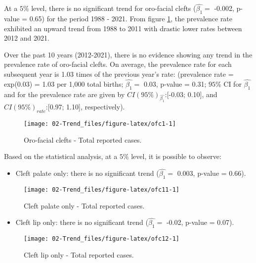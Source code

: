 \documentclass[
]{krantz}
\providecommand{\tightlist}{%
  \setlength{\itemsep}{0pt}\setlength{\parskip}{0pt}}
\begin{document}
At a \(5\%\) level, there is no significant trend for oro-facial clefts (\(\hat{\beta_{1}} =\) -0.002, p-value = 0.65) for the period 1988 - 2021. From figure \ref{fig:ofc1}, the prevalence rate exhibited an upward trend from 1988 to 2011 with drastic lower rates between 2012 and 2021.

Over the past 10 years (2012-2021), there is no evidence showing any trend in the prevalence rate of oro-facial clefts. On average, the prevalence rate for each subsequent year is 1.03 times of the previous year's rate: (prevalence rate = exp(0.03) = 1.03 per 1,000 total births; \(\hat{\beta_{1}} =\) 0.03, p-value = 0.31; \(95\%\) CI for \(\hat{\beta_{1}}\) and for the prevalence rate are given by \(CI(95\%)_{\hat{\beta_{1}}}\):{[}-0.03; 0.10{]}, and \(CI(95\%)_{rate}\):{[}0.97; 1.10{]}, respectively).

\begin{figure}[h]

{\centering \texttt{[image: 02-Trend\_files/figure-latex/ofc1-1]} 

}

\caption{Oro-facial clefts - Total reported cases.}\label{fig:ofc1}
\end{figure}

Based on the statistical analysis, at a \(5\%\) level, it is possible to observe:

\begin{itemize}
\tightlist
\item
  Cleft palate only: there is no significant trend (\(\hat{\beta_{1}} =\) 0.003, p-value = 0.66).
\end{itemize}

\begin{figure}[h]

{\centering \texttt{[image: 02-Trend\_files/figure-latex/ofc11-1]} 

}

\caption{Cleft palate only - Total reported cases.}\label{fig:ofc11}
\end{figure}

\begin{itemize}
\tightlist
\item
  Cleft lip only: there is no significant trend (\(\hat{\beta_{1}} =\) -0.02, p-value = 0.07).
\end{itemize}

\begin{figure}[h]

{\centering \texttt{[image: 02-Trend\_files/figure-latex/ofc12-1]} 

}

\caption{Cleft lip only - Total reported cases.}\label{fig:ofc12}
\end{figure}
\end{document}
